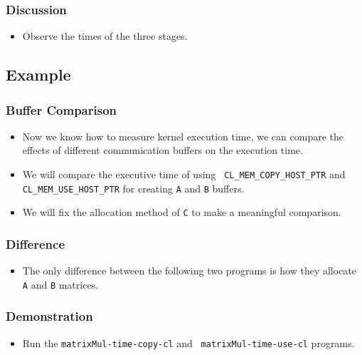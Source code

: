 \documentclass{beamer}
\begin{document}
\begin{frame}
  \frametitle{Discussion}
  \begin{itemize}
  \item Observe the times of the three stages.
  \end{itemize}
\end{frame}

\subsection{Example}

\begin{frame}
  \frametitle{Buffer Comparison}
  \begin{itemize}
    \item Now we know how to measure kernel execution time, we can
      compare the effects of different communication buffers on the
      execution time.
    \item We will compare the executive time of using {\tt
      CL\_MEM\_COPY\_HOST\_PTR} and {\tt CL\_MEM\_USE\_HOST\_PTR} for
      creating {\tt A} and {\tt B} buffers.
    \item We will fix the allocation method of {\tt C} to make a
      meaningful comparison.
  \end{itemize}
\end{frame}

\begin{frame}
  \frametitle{Difference}
  \begin{itemize}
    \item The only difference between the following two programs is
      how they allocate {\tt A} and {\tt B} matrices.
  \end{itemize}
\end{frame}

\begin{frame}
\end{frame}

\begin{frame}
\end{frame}

\begin{frame}
  \frametitle{Demonstration}
  \begin{itemize}
    \item Run the {\tt matrixMul-time-copy-cl} and {\tt
      matrixMul-time-use-cl} programs.
  \end{itemize}
\end{frame}
\end{document}
